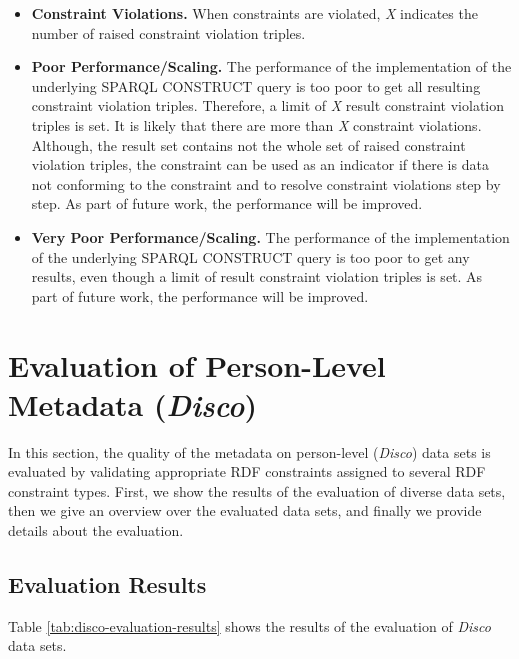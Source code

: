 \documentclass{llncs}
\begin{document}
\begin{itemize}
	\item \textbf{Constraint Violations.}
When constraints are violated, 
\emph{X} indicates the number of raised constraint violation triples. 

  \item
\textbf{Poor Performance/Scaling.}
The performance of the implementation of the underlying SPARQL CONSTRUCT query 
is too poor to get all resulting constraint violation triples. 
Therefore, a limit of \emph{X} result constraint violation triples is set. 
It is likely that there are more than \emph{X} constraint violations.
Although, the result set contains not the whole set of raised constraint violation triples,
the constraint can be used as an indicator if there is data not conforming to the constraint and
to resolve constraint violations step by step. 
As part of future work, the performance will be improved.

  \item
\textbf{Very Poor Performance/Scaling.} 
The performance of the implementation of the underlying SPARQL CONSTRUCT query 
is too poor to get any results, even though a limit of result constraint violation triples is set. 
As part of future work, the performance will be improved. 
\end{itemize}

\section{Evaluation of Person-Level Metadata (\emph{Disco})}

In this section, the quality of the metadata on person-level (\emph{Disco}) data sets is evaluated by validating appropriate RDF constraints assigned to several RDF constraint types.
First, we show the results of the evaluation of diverse data sets, then we give an overview over the evaluated data sets, and finally we provide details about the evaluation.

\subsection{Evaluation Results}

Table \ref{tab:disco-evaluation-results} shows the results of the evaluation of \emph{Disco} data sets.
\end{document}
